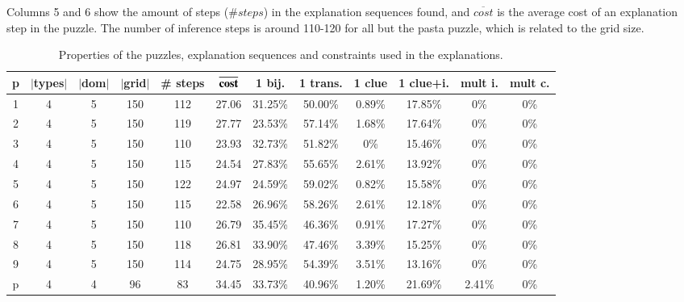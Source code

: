 Columns 5 and 6 show the amount of steps ($\# steps$) in the explanation sequences found, and $\overline{cost}$ is the average cost of an explanation step in the puzzle. The number of inference steps is around 110-120 for all but the pasta puzzle, which is related to the grid size.

\begin{table}[t]
	\centering
	\begin{tabular}{c|ccc|cc|cccccc}
		\textbf{p} & \textbf{$|$types$|$} & \textbf{$|$dom$|$} & \textbf{$|$grid$|$} & \textbf{\# steps} & $\overline{\text{\textbf{cost}}}$ & \textbf{1 bij.} & \textbf{1 trans.} & \textbf{1 clue} & \textbf{1 clue+i.}  & \textbf{mult i.} & \textbf{mult c.} \\\hline
		1 &       4 &            5 &         150 &    112 &      27.06 &  31.25\% &  50.00\% &    0.89\% &        17.85\%   &  0\%  &  0\%  \\
		2 &       4 &            5 &         150 &    119 &      27.77 &  23.53\% &  57.14\% &    1.68\% &        17.64\%   &  0\%  &  0\%  \\
		3 &       4 &            5 &         150 &    110 &      23.93 &  32.73\% &  51.82\% &    0\% &        15.46\%   &  0\%  &  0\%  \\
		4 &       4 &            5 &         150 &    115 &      24.54 &  27.83\% &  55.65\% &    2.61\% &        13.92\%   &  0\%  &  0\%  \\
		5 &       4 &            5 &         150 &    122 &      24.97 &  24.59\% &  59.02\% &    0.82\% &        15.58\%   &  0\%  &  0\%  \\
		6 &       4 &            5 &         150 &    115 &      22.58 &  26.96\% &  58.26\% &    2.61\% &        12.18\%   &  0\%  &  0\%  \\
		7 &       4 &            5 &         150 &    110 &      26.79 &  35.45\% &  46.36\% &    0.91\% &        17.27\%   &  0\%  &  0\%  \\
		8 &       4 &            5 &         150 &    118 &      26.81 &  33.90\% &  47.46\% &    3.39\% &        15.25\%   &  0\%  &  0\%  \\
		9 &       4 &            5 &         150 &    114 &      24.75 &  28.95\% &  54.39\% &    3.51\% &        13.16\%   &  0\%  &  0\%  \\
		p &       4 &            4 &          96 &     83 &      34.45 &  33.73\% &  40.96\% &    1.20\% &        21.69\%   &  2.41\%  &  0\%
	\end{tabular}
	\caption{Properties of the puzzles, explanation sequences and constraints used in the explanations.}
	\label{table:composition}
\end{table}

